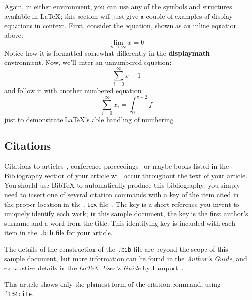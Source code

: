Again, in either environment, you can use any of the symbols
and structures available in \LaTeX\@; this section will just
give a couple of examples of display equations in context.
First, consider the equation, shown as an inline equation above:
\begin{equation}
  \lim_{n\rightarrow \infty}x=0
\end{equation}
Notice how it is formatted somewhat differently in
the \textbf{displaymath}
environment.  Now, we'll enter an unnumbered equation:
\begin{displaymath}
  \sum_{i=0}^{\infty} x + 1
\end{displaymath}
and follow it with another numbered equation:
\begin{equation}
  \sum_{i=0}^{\infty}x_i=\int_{0}^{\pi+2} f
\end{equation}
just to demonstrate \LaTeX's able handling of numbering.

\subsection{Citations}
Citations to articles~\cite{bowman:reasoning,
clark:pct, braams:babel, herlihy:methodology},
conference proceedings~\cite{clark:pct} or maybe
books \cite{Lamport:LaTeX, salas:calculus} listed
in the Bibliography section of your
article will occur throughout the text of your article.
You should use BibTeX to automatically produce this bibliography;
you simply need to insert one of several citation commands with
a key of the item cited in the proper location in
the \texttt{.tex} file~\cite{Lamport:LaTeX}.
The key is a short reference you invent to uniquely
identify each work; in this sample document, the key is
the first author's surname and a
word from the title.  This identifying key is included
with each item in the \texttt{.bib} file for your article.

The details of the construction of the \texttt{.bib} file
are beyond the scope of this sample document, but more
information can be found in the \textit{Author's Guide},
and exhaustive details in the \textit{\LaTeX\ User's
Guide} by Lamport~.

This article shows only the plainest form
of the citation command, using \texttt{{\char'134}cite}.

